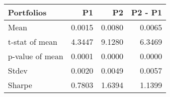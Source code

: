 \begin{tabular}{lrrr}
\toprule
Portfolios & P1 & P2 & P2 - P1 \\
\midrule
Mean & 0.0015 & 0.0080 & 0.0065 \\
t-stat of mean & 4.3447 & 9.1280 & 6.3469 \\
p-value of mean & 0.0001 & 0.0000 & 0.0000 \\
Stdev & 0.0020 & 0.0049 & 0.0057 \\
Sharpe & 0.7803 & 1.6394 & 1.1399 \\
\bottomrule
\end{tabular}
